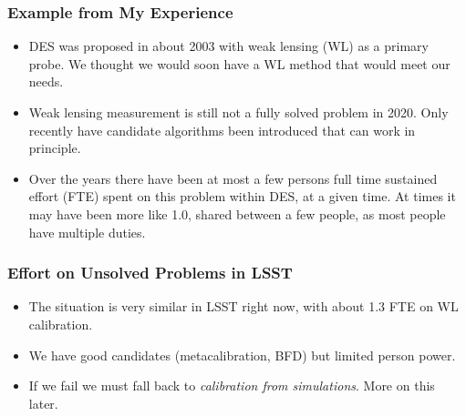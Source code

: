 \documentclass{beamer}
\begin{document}
\frame
{
    \frametitle{Example from My Experience}


    \begin{itemize}

        \item DES was proposed in about 2003 with weak lensing (WL) as a primary
            probe.  We thought we would soon have a WL method that
            would meet our needs.

        \item Weak lensing measurement is still not a fully solved problem in
            2020.  Only recently have candidate algorithms been introduced that
            can work in principle.


        \item  Over the years there have been at most a few persons full time
            sustained effort (FTE) spent on this problem within DES, at a given
            time.  At times it may have been more like 1.0, shared between a few
            people, as most people have multiple duties.


    \end{itemize}

}
\frame
{
    \frametitle{Effort on Unsolved Problems in LSST}


    \begin{itemize}

        \item The situation is very similar in LSST right now, with about 1.3
            FTE on WL calibration.

        \item We have good candidates (metacalibration, BFD) but limited person power.

        \item If we fail we must fall back to {\em calibration from simulations}.  More
            on this later.

    \end{itemize}

}
\end{document}
